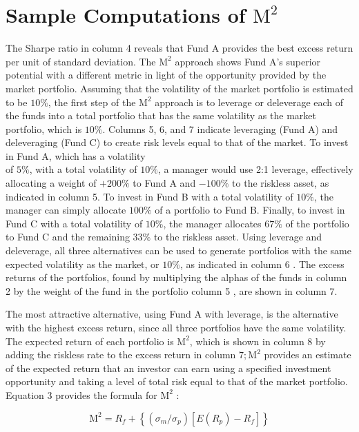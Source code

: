 \documentclass[11pt]{article}
\begin{document}
\section*{Sample Computations of $\mathrm{M}^{2}$}
The Sharpe ratio in column 4 reveals that Fund A provides the best excess return per unit of standard deviation. The $\mathrm{M}^{2}$ approach shows Fund A's superior potential with a different metric in light of the opportunity provided by the market portfolio. Assuming that the volatility of the market portfolio is estimated to be $10 \%$, the first step of the $\mathrm{M}^{2}$ approach is to leverage or deleverage each of the funds into a total portfolio that has the same volatility as the market portfolio, which is $10 \%$. Columns 5, 6, and 7 indicate leveraging (Fund A) and deleveraging (Fund C) to create risk levels equal to that of the market. To invest in Fund A, which has a volatility\\
of $5 \%$, with a total volatility of $10 \%$, a manager would use 2:1 leverage, effectively allocating a weight of $+200 \%$ to Fund A and $-100 \%$ to the riskless asset, as indicated in column 5. To invest in Fund B with a total volatility of $10 \%$, the manager can simply allocate $100 \%$ of a portfolio to Fund B. Finally, to invest in Fund C with a total volatility of $10 \%$, the manager allocates $67 \%$ of the portfolio to Fund C and the remaining $33 \%$ to the riskless asset. Using leverage and deleverage, all three alternatives can be used to generate portfolios with the same expected volatility as the market, or $10 \%$, as indicated in column 6 . The excess returns of the portfolios, found by multiplying the alphas of the funds in column 2 by the weight of the fund in the portfolio column 5 , are shown in column 7.

The most attractive alternative, using Fund A with leverage, is the alternative with the highest excess return, since all three portfolios have the same volatility. The expected return of each portfolio is $\mathrm{M}^{2}$, which is shown in column 8 by adding the riskless rate to the excess return in column $7 ; \mathrm{M}^{2}$ provides an estimate of the expected return that an investor can earn using a specified investment opportunity and taking a level of total risk equal to that of the market portfolio. Equation 3 provides the formula for $\mathrm{M}^{2}$ :


\begin{equation*}
\mathrm{M}^{2}=R_{f}+\left\{\left(\sigma_{m} / \sigma_{p}\right)\left[E\left(R_{p}\right)-R_{f}\right]\right\} \tag{3}
\end{equation*}
\end{document}
